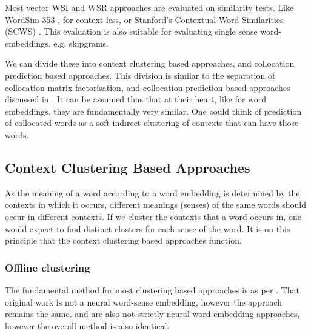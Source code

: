 \documentclass[12pt,parskip]{komatufte}
\begin{document}

Most vector WSI and WSR approaches are evaluated on similarity tests.
Like WordSim-353 \textcite{WordSim353}, for context-less, or Stanford's Contextual Word Similarities (SCWS) \textcite{Huang2012}.
This evaluation is also suitable for evaluating single sense word-embeddings, e.g. skipgrams.


We can divide these into context clustering based approaches,
and collocation prediction based approaches.
This division is similar to the separation of collocation matrix factorisation,
and collocation prediction based approaches discussed in .
It can be assumed thus that at their heart, like for word embeddings,
they are fundamentally very similar.
One could think of prediction of collocated words as a soft indirect clustering of contexts that can have those words.


\subsection{Context Clustering Based Approaches}
As the meaning of a word according to a word embedding is determined by the contexts in which it occurs, different meanings (senses) of the same words should occur in different contexts.
If we cluster the contexts that a word occurs in, one would expect to find distinct clusters for each sense of the word.
It is on this principle that the context clustering based approaches function.



\subsubsection{Offline clustering}
The fundamental method for most clustering based approaches is as per .
That original work is not a neural word-sense embedding, however the approach remains the same.
 and  are also not strictly neural word embedding approaches, however the overall method is also identical.
\end{document}
